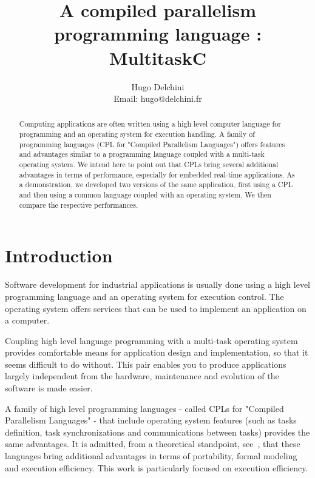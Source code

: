 \documentclass[10pt]{report}
\begin{document}
\title{A compiled parallelism programming language : MultitaskC}

\author{
Hugo Delchini\\
Email: hugo@delchini.fr\\
}

\maketitle
\thispagestyle{empty}

\begin{abstract}

Computing applications are often written using a high level
computer language for programming and an operating system for
execution handling. A family of programming languages (CPL for
"Compiled Parallelism Languages") offers features and advantages
similar to a programming language coupled with a multi-task
operating system. We intend here to point out that CPLs bring
several additional advantages in terms of performance, especially
for embedded real-time applications. As a demonstration, we
developed two versions of the same application, first using a CPL
and then using a common language coupled with an operating
system. We then compare the respective performances.

\end{abstract}

\tableofcontents

\chapter{Introduction}
\label{sec:intro}

Software development for industrial applications is usually done
using a high level programming language and an operating system
for execution control. The operating system offers services that
can be used to implement an application on a computer.

Coupling high level language programming with a multi-task
operating system provides comfortable means for application
design and implementation, so that it seems difficult to do
without. This pair enables you to produce applications largely
independent from the hardware, maintenance and evolution of the
software is made easier.

A family of high level programming languages - called CPLs for
"Compiled Parallelism Languages" - that include operating system
features (such as tasks definition, task synchronizations and
communications between tasks) provides the same advantages. It is
admitted, from a theoretical standpoint, see~\cite{Halbwachs:91}, that
these languages bring additional advantages in terms of
portability, formal modeling and execution efficiency. This work
is particularly focused on execution efficiency.
\end{document}
